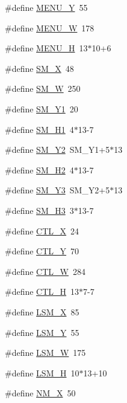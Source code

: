 \begin{DoxyCompactItemize}
\item 
\#define \hyperlink{WL__MENU_8H_ab5f43ff9ab0e3f21e92d4729d84e57ac}{MENU\_\-Y}~55
\item 
\#define \hyperlink{WL__MENU_8H_a8ab012c9b505a97138d6f18221340188}{MENU\_\-W}~178
\item 
\#define \hyperlink{WL__MENU_8H_a9552ba249c0540ffe9a08a05d1b92504}{MENU\_\-H}~13$\ast$10+6
\item 
\#define \hyperlink{WL__MENU_8H_a32546f28fceb0d6cfd271f4e67a960da}{SM\_\-X}~48
\item 
\#define \hyperlink{WL__MENU_8H_a98fb002600c4a059117b60e6901c9e4e}{SM\_\-W}~250
\item 
\#define \hyperlink{WL__MENU_8H_a91b9840ef31e8ea3213dfde423aa3f7f}{SM\_\-Y1}~20
\item 
\#define \hyperlink{WL__MENU_8H_adba6dfabf755e54c84886c57ca504ce7}{SM\_\-H1}~4$\ast$13-\/7
\item 
\#define \hyperlink{WL__MENU_8H_a0181ef73bf2f87d1a7165418aca923f2}{SM\_\-Y2}~SM\_\-Y1+5$\ast$13
\item 
\#define \hyperlink{WL__MENU_8H_a48d5362cb91bcd83d38c0938355084e1}{SM\_\-H2}~4$\ast$13-\/7
\item 
\#define \hyperlink{WL__MENU_8H_a749d1c9729b10cf5a7b8ea1216384d53}{SM\_\-Y3}~SM\_\-Y2+5$\ast$13
\item 
\#define \hyperlink{WL__MENU_8H_a1778354e4291b2fbceb434ac96d5dfcd}{SM\_\-H3}~3$\ast$13-\/7
\item 
\#define \hyperlink{WL__MENU_8H_af7160a6f16e19b19a4b15e663b88ce67}{CTL\_\-X}~24
\item 
\#define \hyperlink{WL__MENU_8H_a5bf6008e2144536043497d7f080fca3c}{CTL\_\-Y}~70
\item 
\#define \hyperlink{WL__MENU_8H_a7421711c94aa4c7d682a285b6380b923}{CTL\_\-W}~284
\item 
\#define \hyperlink{WL__MENU_8H_af64dcd1621c3f15dd0340ac7c74f8494}{CTL\_\-H}~13$\ast$7-\/7
\item 
\#define \hyperlink{WL__MENU_8H_a6b5eb588d722f86b09369b40a4f762e3}{LSM\_\-X}~85
\item 
\#define \hyperlink{WL__MENU_8H_a4c59449f0196f3dfa779565be7210291}{LSM\_\-Y}~55
\item 
\#define \hyperlink{WL__MENU_8H_a1183e7175b1265d4bdae14d38ee03775}{LSM\_\-W}~175
\item 
\#define \hyperlink{WL__MENU_8H_a8cf38e17b7fc1dee592464d3f17c6b26}{LSM\_\-H}~10$\ast$13+10
\item 
\#define \hyperlink{WL__MENU_8H_a446f2f83d0e0ce3106bf26ae1e53f860}{NM\_\-X}~50

\end{DoxyCompactItemize}
